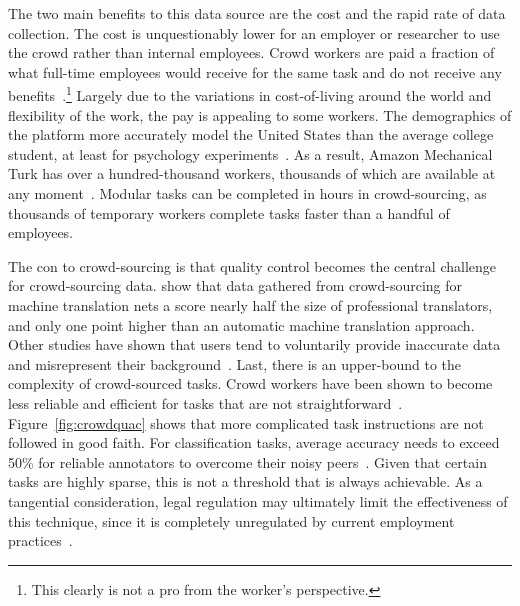 

The two main benefits to this data source are the cost and the rapid rate of data collection.  
%
The cost is unquestionably lower for an employer or researcher to use the crowd rather than internal employees.
%  
Crowd workers are paid a fraction of what full-time employees would receive for the same task and do not receive any benefits~\citep{whiting2019fair}.\footnote{This clearly is not a pro from the worker's perspective.}  
%
Largely due to the variations in cost-of-living around the world and flexibility of the work, the pay is appealing to some workers.  
%
The demographics of the platform more accurately model the United States than the average college student, at least for psychology experiments~\citep{buhrmester2016amazon}.  
%
As a result, Amazon Mechanical Turk has over a hundred-thousand workers, thousands of which are available at any moment~\citep{difallah2018demographics}.  
%
Modular tasks can be completed in hours in crowd-sourcing, as thousands of temporary workers complete tasks faster than a handful of employees.  

The con to crowd-sourcing is that quality control becomes the  central challenge for crowd-sourcing \nlp{} data.
%
\citet{zaidan2011crowdsourcing} show that data gathered from crowd-sourcing for machine translation nets a \bleu{} score nearly half the size of professional translators, and only one point higher than an automatic machine translation approach.  
%
Other studies have shown that users tend to voluntarily provide inaccurate data~\citep{suri2011honesty} and misrepresent their background~\citep{chandler2017lie, wessling2017mturk}.
%
Last, there is an upper-bound to the complexity of crowd-sourced tasks.  
%
Crowd workers have been shown to become less reliable and efficient for tasks that are not straightforward~\citep{finnerty2013keep}.
%
Figure~\ref{fig:crowdquac} shows that more complicated \nlp{} task instructions are not followed in good faith.  
%
For classification tasks, average accuracy needs to exceed 50\% for reliable annotators to overcome their noisy peers~\citep{kumar2011learning}.
%
Given that certain tasks are highly sparse, this is not a threshold that is always achievable.  
%
As a tangential consideration, legal regulation may ultimately limit the effectiveness of this technique, since it is completely unregulated by current employment practices~\citep{wolfson2011look}.  
%

